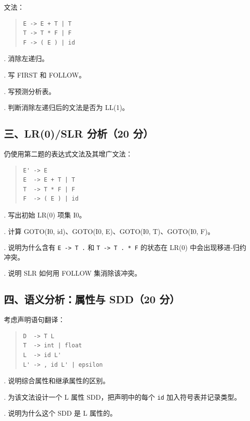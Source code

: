 \documentclass[UTF8,zihao=-4]{ctexart}
\begin{document}
文法：

\begin{quote}
\footnotesize
\begin{verbatim}
E -> E + T | T
T -> T * F | F
F -> ( E ) | id
\end{verbatim}
\end{quote}

. 消除左递归。\par
{}. 写 FIRST 和 FOLLOW。\par
{}. 写预测分析表。\par
{}. 判断消除左递归后的文法是否为 LL(1)。\par

\subsection*{三、LR(0)/SLR 分析（20 分）}

仍使用第二题的表达式文法及其增广文法：

\begin{quote}
\footnotesize
\begin{verbatim}
E' -> E
E  -> E + T | T
T  -> T * F | F
F  -> ( E ) | id
\end{verbatim}
\end{quote}

. 写出初始 LR(0) 项集 I0。\par
{}. 计算 GOTO(I0, id)、GOTO(I0, E)、GOTO(I0, T)、GOTO(I0, F)。\par
{}. 说明为什么含有 \texttt{E -> T .} 和 \texttt{T -> T . * F} 的状态在 LR(0) 中会出现移进-归约冲突。\par
{}. 说明 SLR 如何用 FOLLOW 集消除该冲突。\par

\subsection*{四、语义分析：属性与 SDD（20 分）}

考虑声明语句翻译：

\begin{quote}
\footnotesize
\begin{verbatim}
D  -> T L
T  -> int | float
L  -> id L'
L' -> , id L' | epsilon
\end{verbatim}
\end{quote}

. 说明综合属性和继承属性的区别。\par
{}. 为该文法设计一个 L 属性 SDD，把声明中的每个 \texttt{id} 加入符号表并记录类型。\par
{}. 说明为什么这个 SDD 是 L 属性的。\par
\end{document}
